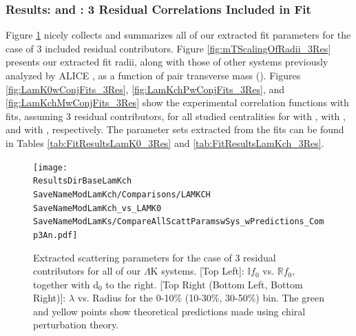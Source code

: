 \documentclass[/home/jesse/Analysis/FemtoAnalysis/AnalysisNotes/AnalysisNoteJBuxton.tex]{subfiles}
\renewcommand{\NonFlatBgdLamKch}{_NonFlatBgdCrctnPolynomial}
\renewcommand{\NonFlatBgdLamKs}{_NonFlatBgdCrctnLinear}
\renewcommand{\ResNum}{_3Res}
\renewcommand{\PrimMaxDecay}{_PrimMaxDecay10fm}
\renewcommand{\SaveNameModLamKch}{\MomRes\NonFlatBgdLamKch\ResNum\PrimMaxDecay\ResMethod\ParamFixAndShareLamKch}
\renewcommand{\SaveNameModLamKs}{\MomRes\NonFlatBgdLamKs\ResNum\PrimMaxDecay\ResMethod\ParamFixAndShareLamKs}
\begin{document}
\subsubsection{Results: \LamKs and \LamKpm: 3 Residual Correlations Included in Fit}
\label{ResultsLamK_3Res}

Figure \ref{fig:ScattParams_3Res} nicely collects and summarizes all of our extracted fit parameters for the case of 3 included residual contributors.  Figure \ref{fig:mTScalingOfRadii_3Res} presents our extracted fit radii, along with those of other systems previously analyzed by ALICE \cite{Adam:2015vja}, as a function of pair transverse mass (\mt).
Figures \ref{fig:LamK0wConjFits_3Res}, \ref{fig:LamKchPwConjFits_3Res}, and \ref{fig:LamKchMwConjFits_3Res} show the experimental correlation functions with fits, assuming 3 residual contributors, for all studied centralities for \LamKs with \ALamKs, \LamKchP with \ALamKchM, and \LamKchM with \ALamKchP, respectively.
The parameter sets extracted from the fits can be found in Tables \ref{tab:FitResultsLamK0_3Res} and \ref{tab:FitResultsLamKch_3Res}.

\begin{figure}[h]
  \centering
  \texttt{[image: \\ResultsDirBaseLamKch\\SaveNameModLamKch/Comparisons/LAMKCH\\SaveNameModLamKch\_vs\_LAMK0\\SaveNameModLamKs/CompareAllScattParamswSys\_wPredictions\_Comp3An.pdf]}
  \caption[Extracted Scattering Parameters: 3 Residuals in Fit]{Extracted scattering parameters for the case of 3 residual contributors for all of our $\Lambda$K systems.  [Top Left]: $\mathbb{I}f_{0}$ vs. $\mathbb{R}f_{0}$, together with d$_{0}$ to the right.  [Top Right (Bottom Left, Bottom Right)]: $\lambda$ vs. Radius for the 0-10\% (10-30\%, 30-50\%) bin.  The green \cite{Liu:2006xja} and yellow \cite{Mai:2009ce} points show theoretical predictions made using chiral perturbation theory.}
  \label{fig:ScattParams_3Res}
\end{figure}
\end{document}
